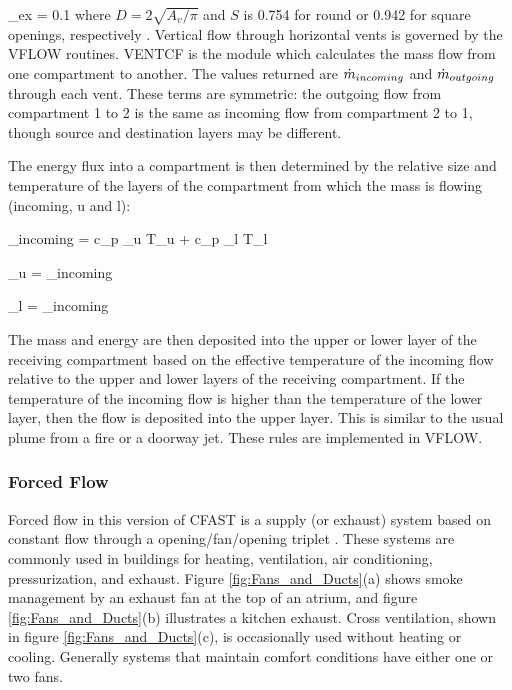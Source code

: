 \be \dm_{ex} = 0.1   \ee
where $D = 2 \sqrt{A_v / \pi}$ and $S$ is 0.754 for round or 0.942 for square openings, respectively \cite{Cooper:1989}. Vertical flow through horizontal vents is governed by the VFLOW routines. VENTCF is the module which calculates the mass flow from one compartment to another. The values returned are $\dot{m}_{incoming}$ and $\dot{m}_{outgoing}$ through each vent. These terms are symmetric: the outgoing flow from compartment 1 to 2 is the same as incoming flow from compartment 2 to 1, though source and destination layers may be different.

The energy flux into a compartment is then determined by the relative size and temperature of the layers of the compartment from which the mass is flowing (incoming, u and l):

\be \dq_{incoming} = c_p \dm_u T_u + c_p \dm_l T_l \ee

\be \dm_u = \dm_{incoming}  \ee

\be \dm_l = \dm_{incoming}  \ee


The mass and energy are then deposited into the upper or lower layer of the receiving compartment based on the effective temperature of the incoming flow relative to the upper and lower layers of the receiving compartment. If the temperature of the incoming flow is higher than the temperature of the lower layer, then the flow is deposited into the upper layer. This is similar to the usual plume from a fire or a doorway jet. These rules are implemented in VFLOW.

\subsubsection{Forced Flow}

Forced flow in this version of CFAST is a supply (or exhaust) system based on constant flow through a opening/fan/opening triplet . These systems are commonly used in buildings for heating, ventilation, air conditioning, pressurization, and exhaust. Figure \ref{fig:Fans_and_Ducts}(a) shows smoke management by an exhaust fan at the top of an atrium, and figure \ref{fig:Fans_and_Ducts}(b) illustrates a kitchen exhaust.  Cross ventilation, shown in figure \ref{fig:Fans_and_Ducts}(c), is occasionally used without heating or cooling.  Generally systems that maintain comfort conditions have either one or two fans.

